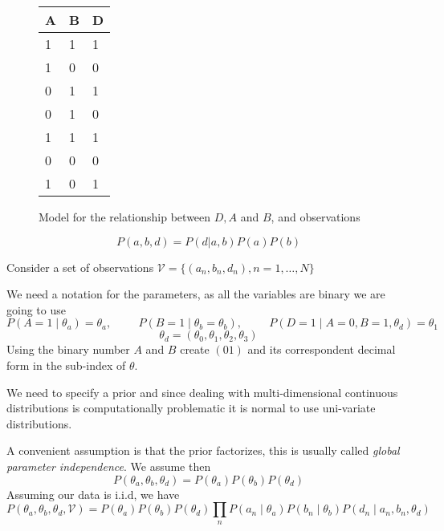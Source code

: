 \begin{figure}[!ht]
  \centering
  \qquad
  \begin{tabular}{|l|l|l|}
    \hline
    A & B & D \\ \hline
    1 & 1 & 1 \\ \hline
    1 & 0 & 0 \\ \hline
    0 & 1 & 1 \\ \hline
    0 & 1 & 0 \\ \hline
    1 & 1 & 1 \\ \hline
    0 & 0 & 0 \\ \hline
    1 & 0 & 1 \\ \hline
  \end{tabular}
  \caption{Model for the relationship between \(D,A\) and \(B\), and
    observations}
 \label{fig:bayesian_example}
\end{figure}



\[
P(a,b,d) = P(d|a,b)P(a)P(b)
\]

Consider a set of observations
\(\mathcal{V} = \{(a_{n}, b_{n}, d_{n}), n = 1,\dots , N\}\)

We need a notation for the parameters, as all the variables are binary we are
going to use
\[
  P(A = 1 \mid \theta_{a}) = \theta_{a}, \hspace{1cm} P(B = 1 \mid \theta_{b} = \theta_{b}), \hspace{1cm} P(D = 1 \mid A = 0, B = 1, \theta_{d}) = \theta_{1}
\]
\[\theta_{d} = (\theta_{0}, \theta_{1}, \theta_{2}, \theta_{3})\]
Using the binary number \(A\) and \(B\) create \((01)\) and its correspondent
decimal form in the sub-index of \(\theta\).

We need to specify a prior and since dealing with multi-dimensional continuous
distributions is computationally problematic it is normal to use uni-variate
distributions.

A convenient assumption is that the prior factorizes, this is usually called
\emph{global parameter independence}. We assume then
\[
  P(\theta_{a}, \theta_{b}, \theta_{d}) = P(\theta_{a})P(\theta_{b})P(\theta_{d})
\]
Assuming our data is i.i.d, we have
\[
  P(\theta_{a}, \theta_{b}, \theta_{d}, \mathcal{V}) = P(\theta_{a})P(\theta_{b})P(\theta_{d})\prod_{n}P(a_{n}\mid \theta_{a})P(b_{n} \mid \theta_{b})P(d_{n}\mid a_{n}, b_{n}, \theta_{d})
\]

